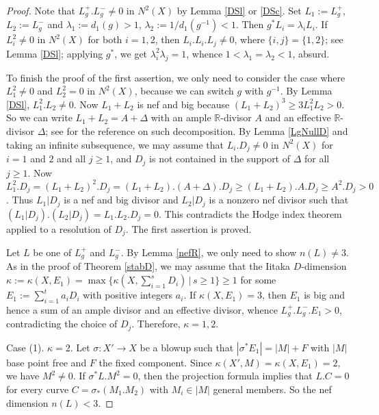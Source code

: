 \documentclass[11pt,a4paper,psamsfonts]{amsart}
\theoremstyle{plain}
\theoremstyle{definition}
\theoremstyle{remark}
\begin{document}
\begin{proof}
Note that $L_g^+ . L_g^- \ne 0$ in $N^2(X)$ by Lemma \ref{DSl} or \ref{DSc}.
Set $L_1 := L_g^+$, $L_2 := L_g^-$ and
$\lambda_1 := d_1(g) > 1$, $\lambda_2 := 1/d_1(g^{-1}) < 1$.
Then $g^*L_i = \lambda_i L_i$.
If $L_i^2 \ne 0$ in $N^2(X)$ for both $i = 1, 2$,
then $L_i . L_i . L_j \ne 0$, where
$\{i, j\} = \{1, 2\}$; see Lemma \ref{DSl};  applying $g^*$, we get
$\lambda_i^2 \lambda_j = 1$, whence $1 < \lambda_1 = \lambda_2 < 1$, absurd.

To finish the proof of the first assertion,
we only need to consider the case where $L_1^2 \ne 0$ and $L_2^2 = 0$
in $N^2(X)$, because we can switch $g$ with $g^{-1}$.
By Lemma \ref{DSl}, $L_1^2 . L_2 \ne 0$.
Now $L_1 + L_2$ is nef and big because
$(L_1+L_2)^3 \ge 3L_1^2 L_2 > 0$.
So we can write $L_1 + L_2 = A + \Delta$ with an ample ${\mathbb{R}}$-divisor $A$ and an effective
${\mathbb{R}}$-divisor $\Delta$; see \cite[Lemma 2.23]{Z2}
for the reference on such decomposition.
By Lemma \ref{LgNullD} and taking an infinite subsequence,
we may assume that
$L_i . D_j \ne 0$ in $N^2(X)$ for $i = 1$ and $2$ and all $j \ge 1$, and
$D_j$ is not contained in the support of $\Delta$ for all $j \ge 1$.
Now $L_1^2 . D_j = (L_1 + L_2)^2 . D_j = (L_1 + L_2) . (A + \Delta) . D_j
\ge (L_1 + L_2) . A . D_j \ge A^2 . D_j > 0$. Thus $L_1|D_j$ is a nef and big divisor and
$L_2|D_j$ is a nonzero nef divisor such that $(L_1|D_j) . (L_2|D_j) = L_1 . L_2 . D_j = 0$.
This contradicts the Hodge index theorem applied to a resolution of $D_j$.
The first assertion is proved.

Let $L$ be one of $L_g^+$ and $L_g^-$. By Lemma \ref{nefR}, we only need to show $n(L) \ne 3$.
As in the proof of Theorem \ref{stabD}, we may assume that the Iitaka $D$-dimension
$\kappa := \kappa(X, E_1) = \max\{\kappa(X, \sum_{i=1}^s D_{i}) \, | \, s \ge 1\} \ge 1$
for some $E_1 := \sum_{i=1}^{t} a_i D_i$ with positive integers $a_i$.
If $\kappa(X, E_1) = 3$, then $E_1$ is big and hence a sum of an ample
divisor and an effective divisor, whence $L_g^+ . L_g^- . E_1 > 0$,
contradicting the choice of $D_j$. Therefore,
$\kappa = 1, 2$.

Case (1). $\kappa = 2$. Let $\sigma : X' \to X$ be a blowup such that
$|\sigma^*E_1| = |M| + F$ with $|M|$ base point free and $F$ the fixed component.
Since $\kappa(X', M) = \kappa(X, E_1) = 2$, we have $M^2 \ne 0$.
If $\sigma^*L . M^2 = 0$, then the projection formula implies that
$L . C = 0$ for every curve $C = \sigma_*(M_1 . M_2)$
with $M_i \in |M|$ general members. So the nef dimension $n(L) < 3$.


\end{proof}
\end{document}
